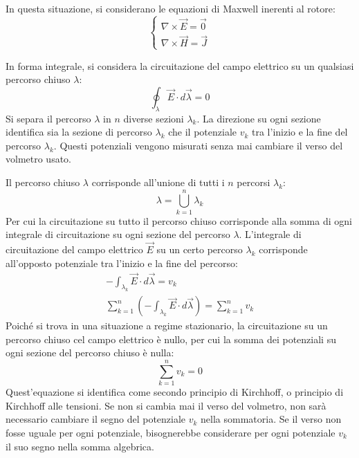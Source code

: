 \documentclass{article}
\numberwithin{equation}{subsection}
\begin{document}
In questa situazione, si considerano le equazioni di Maxwell inerenti al rotore:
\begin{equation*}
    \begin{cases}
        \nabla\times\vec{E}=\vec0\\
        \nabla\times\vec{H}=\vec{J}
    \end{cases}
\end{equation*}


In forma integrale, si considera la circuitazione del campo elettrico su un qualsiasi percorso chiuso $\lambda$:
\begin{equation*}
    \displaystyle\oint_{\lambda}\vec{E}\cdot d\vec{\lambda}=0
\end{equation*}
Si separa il percorso $\lambda$ in $n$ diverse sezioni $\lambda_k$. La direzione su ogni sezione identifica sia la sezione di percorso $\lambda_k$ che il potenziale $v_k$ tra 
l'inizio e la fine del percorso $\lambda_k$. Questi potenziali vengono misurati senza mai cambiare il verso del volmetro usato. 

Il percorso chiuso $\lambda$ corrisponde all'unione di tutti i $n$ percorsi $\lambda_k$:
\begin{equation*}
    \lambda=\bigcup_{k=1}^n\lambda_k
\end{equation*}
Per cui la circuitazione su tutto il percorso chiuso corrisponde alla somma di ogni integrale di circuitazione su ogni sezione del percorso $\lambda$. L'integrale di circuitazione 
del campo elettrico $\vec{E}$ su un certo percorso $\lambda_k$ corrisponde all'opposto potenziale tra l'inizio e la fine del percorso:
\begin{gather*}
    -\int_{\lambda_k}\vec{E}\cdot d\vec{\lambda}=v_k\\
    \displaystyle\sum_{k=1}^n\left(-\int_{\lambda_k}\vec{E}\cdot d\vec{\lambda}\right)=\sum_{k=1}^nv_k
\end{gather*}
Poiché si trova in una situazione a regime stazionario, la circuitazione su un percorso chiuso cel campo elettrico è nullo, per cui la somma dei potenziali su ogni sezione 
del percorso chiuso è nulla:
\begin{equation}
    \displaystyle\sum_{k=1}^nv_k=0
\end{equation}
Quest'equazione si identifica come secondo principio di Kirchhoff, o principio di Kirchhoff alle tensioni. 
Se non si cambia mai il verso del volmetro, non sarà necessario cambiare il segno del potenziale $v_k$ nella sommatoria. Se il verso non fosse uguale per ogni potenziale, 
bisognerebbe considerare per ogni potenziale $v_k$ il suo segno nella somma algebrica. 
\end{document}
